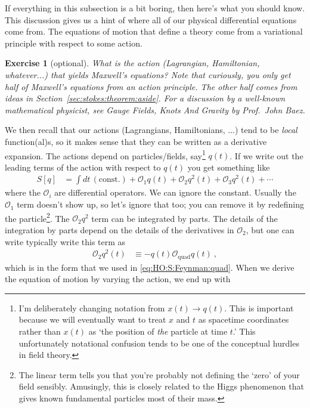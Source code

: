 \documentclass[
  11pt,
	colorful,
	raggedright,
]{tufte-style-thesis-flip}
\newtheorem{exercise}{Exercise}[section]
\begin{document}
If everything in this subsection is a bit boring, then here's what you should know. This discussion gives us a hint of where all of our physical differential equations come from. The equations of motion that define a theory come from a variational principle with respect to some action. 
\begin{exercise}
[optional] What is the action (Lagrangian, Hamiltonian, whatever...) that yields Maxwell's equations? Note that curiously, you only get half of Maxwell's equations from an action principle. The other half comes from ideas in Section~\ref{sec:stokes:theorem:aside}. For a discussion by a well-known  mathematical physicist, see \emph{Gauge Fields, Knots And Gravity} by Prof.~John Baez.
\end{exercise}
We then recall that our actions (Lagrangians, Hamiltonians, ...) tend to be \emph{local} function(al)s, so it makes sense that they can be written as a derivative expansion. The actions depend on particles/fields, say\footnote{I'm deliberately changing notation from $x(t)\to q(t)$. This is important because we will eventually want to treat $x$ and $t$ as spacetime coordinates rather than $x(t)$ as `the position of \emph{the} particle at time $t$.' This unfortunately notational confusion tends to be one of the conceptual hurdles in field theory.} $q(t)$. If we write out the leading terms of the action with respect to $q(t)$ you get something like
\begin{align}
  S[q] &= \int dt \, (\text{const.}) + \mathcal O_1 q(t) + \mathcal O_2 q^2(t) + \mathcal O_3 q^2(t) + \cdots
\end{align}
where the $\mathcal O_i$ are differential operators. We can ignore the constant. Usually the $\mathcal O_1$ term doesn't show up, so let's ignore that too; you can remove it by redefining the particle\footnote{The linear term tells you that you're probably not defining the `zero' of your field sensibly. Amusingly, this is closely related to the Higgs phenomenon that gives known fundamental particles most of their mass.}. The $\mathcal O_2 q^2$ term can be integrated by parts. The details of the integration by parts depend on the details of the derivatives in $\mathcal O_2$, but one can write typically write this term as
\begin{align}
  \mathcal O_2 q^2(t) &\equiv - q(t) \mathcal O_\text{quad} q(t) \ ,
\end{align}
which is in the form that we used in \eqref{eq:HO:S:Feynman:quad}. When we derive the equation of motion by varying the action, we end up with
\end{document}
